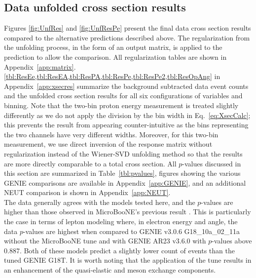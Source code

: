 \documentclass[amsmath,amssymb,aps,prd,showpacs,twocolumn,superscriptaddress,letterpaper,longbibliography, floatfix]{revtex4-2}
\begin{document}
\subsection{Data unfolded cross section results}
\label{sec:Results}
Figures \ref{fig:UnfRes} and \ref{fig:UnfResPe} present the final data cross section results compared to the alternative predictions described above. The regularization from the unfolding process, in the form of an output matrix, is applied to the prediction to allow the comparison. All regularization tables are shown in Appendix~\ref{app:matrix}. \cref{tbl:ResEe,tbl:ResEA,tbl:ResPA,tbl:ResPe,tbl:ResPe2,tbl:ResOpAng} in Appendix~\ref{app:xsecres} summarize the background subtracted data event counts and the unfolded cross section results for all six configurations of variables and binning. Note that the two-bin proton energy measurement is treated slightly differently as we do not apply the division by the bin width in Eq.~\ref{eq:XsecCalc}; this prevents the result from appearing counter-intuitive as the bins representing the two channels have very different widths. Moreover, for this two-bin measurement, we use direct inversion of the response matrix without regularization instead of the Wiener-SVD unfolding method so that the results are more directly comparable to a total cross section. All $p$-values discussed in this section are summarized in Table~\ref{tbl:pvalues}, figures showing the various GENIE comparisons are available in Appendix~\ref{app:GENIE}, and an additional NEUT comparison is shown in Appendix~\ref{app:NEUT}.\\ 


The data generally agrees with the models tested here, and the $p$-values are higher than those observed in MicroBooNE's previous result \cite{MicroBooNEXsec}. This is particularly the case in terms of lepton modeling where, in electron energy and angle, the data $p$-values are highest when compared to GENIE v3.0.6 G18\_10a\_02\_11a without the MicroBooNE tune and with GENIE AR23 v3.6.0 with $p$-values above 0.887. Both of these models predict a slightly lower count of events than the tuned GENIE G18T. It is worth noting that the application of the tune results in an enhancement of the quasi-elastic and meson exchange components.\\ 
\end{document}
